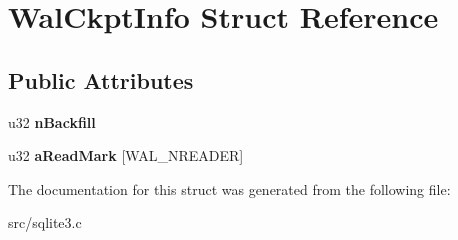 \hypertarget{struct_wal_ckpt_info}{\section{Wal\-Ckpt\-Info Struct Reference}
\label{struct_wal_ckpt_info}
}
\subsection*{Public Attributes}
\begin{DoxyCompactItemize}
\item 
\hypertarget{struct_wal_ckpt_info_a5185e508f7da44c391b692e957a84ff6}{u32 {\bfseries n\-Backfill}}\label{struct_wal_ckpt_info_a5185e508f7da44c391b692e957a84ff6}

\item 
\hypertarget{struct_wal_ckpt_info_a3bc01a8244045941d5f59f01123a7735}{u32 {\bfseries a\-Read\-Mark} \mbox{[}W\-A\-L\-\_\-\-N\-R\-E\-A\-D\-E\-R\mbox{]}}\label{struct_wal_ckpt_info_a3bc01a8244045941d5f59f01123a7735}

\end{DoxyCompactItemize}


The documentation for this struct was generated from the following file\-:\begin{DoxyCompactItemize}
\item 
src/sqlite3.\-c\end{DoxyCompactItemize}

